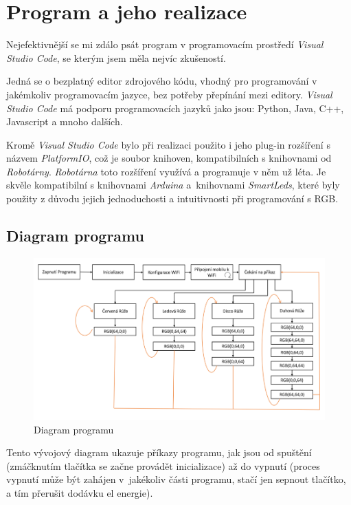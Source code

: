 \chapter{Program a jeho realizace}
Nejefektivnější se mi zdálo psát program v programovacím prostředí \textit{Visual Studio Code}\cite{Visualstudio}, se kterým jsem měla nejvíc zkušeností. 

Jedná se o bezplatný editor zdrojového kódu, vhodný pro programování v jakémkoliv programovacím jazyce, bez potřeby přepínání mezi editory. \textit{Visual Studio Code} má podporu programovacích jazyků jako jsou: Python, Java, C++, Javascript a mnoho dalších. 

Kromě \textit{Visual Studio Code} bylo při realizaci použito i jeho plug-in rozšíření s názvem \textit{PlatformIO}\cite{platformio}, což je soubor knihoven, kompatibilních s knihovnami od \textit{Robotárny}. \textit{Robotárna} toto rozšíření využívá a programuje v něm už léta.  Je skvěle kompatibilní s knihovnami \textit{Arduina} a~knihovnami \textit{SmartLeds}, které byly použity z důvodu jejich jednoduchosti a intuitivnosti při programování s RGB.



\section{Diagram programu }

\begin{figure}[htbp]
	\centering
	\includegraphics[width=1\textwidth]{img/04 prog/Diagram programu.png}
	\caption{Diagram programu}
\end{figure}

Tento vývojový diagram ukazuje příkazy programu, jak jsou od spuštění (zmáčknutím tlačítka se začne provádět inicializace) až do vypnutí (proces vypnutí může být zahájen v~jakékoliv části programu, stačí jen sepnout tlačítko, a tím přerušit dodávku el energie). 
\newpage

